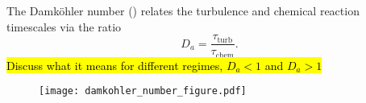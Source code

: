 The Damköhler number (\cite{damkoehler_effect_1947}) relates the turbulence and chemical reaction timescales via the ratio
\begin{equation}
D_a = \frac{\tau_{\text{turb}}}{\tau_{\text{chem}}}.
\end{equation}
\hl{Discuss what it means for different regimes, $D_a<1$ and $D_a > 1$}

\begin{figure}[h]
	\centering
	\texttt{[image: damkohler\_number\_figure.pdf]}
	\caption{}
	\label{fig:damkohler}
\end{figure}